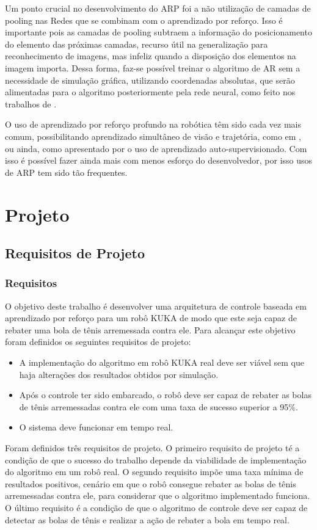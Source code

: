 \documentclass[]{politex}
\begin{document}
Um ponto crucial no desenvolvimento do ARP foi a não utilização de camadas de pooling nas Redes que se combinam com o aprendizado por reforço. Isso é importante pois as camadas de pooling subtraem a informação do posicionamento do elemento das próximas camadas, recurso útil na generalização para reconhecimento de imagens, mas infeliz quando a disposição dos elementos na imagem importa. Dessa forma, faz-se possível treinar o algoritmo de AR sem a necessidade de simulação gráfica, utilizando coordenadas absolutas, que serão alimentadas para o algoritmo posteriormente pela rede neural, como feito nos trabalhos de \cite{Marcin,OpenAI2019}.

O uso de aprendizado por reforço profundo na robótica têm sido cada vez mais comum, possibilitando aprendizado simultâneo de visão e trajetória, como em \cite{Schwab,Kalashnikov2018}, ou ainda,  como apresentado por \cite{Vecerik2020,Jeong2020} o uso de aprendizado auto-supervisionado. Com isso é possível fazer ainda mais com menos esforço do desenvolvedor, por isso usos de ARP tem sido tão frequentes.

\part{Projeto}
\chapter{Requisitos de Projeto}
\section{Requisitos}
O objetivo deste trabalho é desenvolver uma arquitetura de controle baseada em aprendizado por reforço para um robô KUKA de modo que este seja capaz de rebater uma bola de tênis arremessada contra ele. Para alcançar este objetivo foram definidos os seguintes requisitos de projeto:
\begin{itemize}
\item{A implementação do algoritmo em robô KUKA real deve ser viável sem que haja alterações dos resultados obtidos por simulação.}
\item{Após o controle ter sido embarcado, o robô deve ser capaz de rebater as bolas de tênis arremessadas contra ele com uma taxa de sucesso superior a 95\%.}
\item{O sistema deve funcionar em tempo real.}
\end{itemize}

Foram definidos três requisitos de projeto. O primeiro requisito de projeto té a condição de que o sucesso do trabalho depende da viabilidade de implementação do algoritmo em um robô real. O segundo requisito impõe uma taxa mínima de resultados positivos, cenário em que o robô consegue rebater as bolas de tênis arremessadas contra ele, para considerar que o algoritmo implementado funciona. O último requisito é a condição de que o algoritmo de controle deve ser capaz de detectar as bolas de tênis e realizar a ação de rebater a bola em tempo real.
\end{document}
